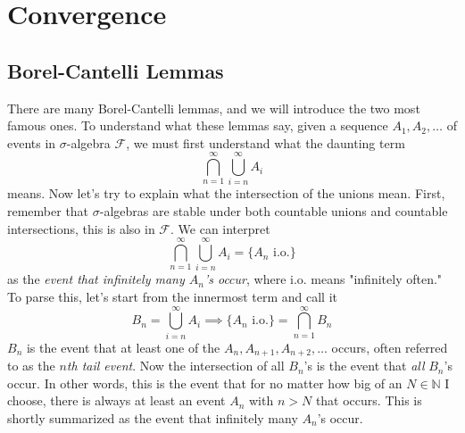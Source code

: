 \section{Convergence}

\subsection{Borel-Cantelli Lemmas}

  There are many Borel-Cantelli lemmas, and we will introduce the two most famous ones. To understand what these lemmas say, given a sequence $A_1, A_2, \ldots$ of events in $\sigma$-algebra $\mathcal{F}$, we must first understand what the daunting term  
  \begin{equation}
    \bigcap_{n=1}^\infty \bigcup_{i = n}^\infty A_i
  \end{equation}
  means. Now let's try to explain what the intersection of the unions mean. First, remember that $\sigma$-algebras are stable under both countable unions and countable intersections, this is also in $\mathcal{F}$. We can interpret 
  \begin{equation}
    \bigcap_{n=1}^\infty \bigcup_{i=n}^\infty A_i = \{ A_n \text{ i.o.}\}
  \end{equation}
  as the \textit{event that infinitely many $A_n$'s occur}, where i.o. means "infinitely often." To parse this, let's start from the innermost term and call it 
  \begin{equation}
    B_n = \bigcup_{i=n}^\infty A_i \implies \{A_n \text{ i.o.}\} = \bigcap_{n=1}^\infty B_n
  \end{equation}
  $B_n$ is the event that at least one of the $A_n, A_{n+1}, A_{n+2}, \ldots$ occurs, often referred to as the \textit{$n$th tail event}. Now the intersection of all $B_n$'s is the event that \textit{all} $B_n$'s occur. In other words, this is the event that for no matter how big of an $N \in \mathbb{N}$ I choose, there is always at least an event $A_n$ with $n > N$ that occurs. This is shortly summarized as the event that infinitely many $A_n$'s occur. 

